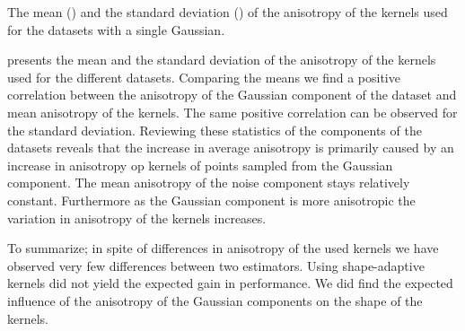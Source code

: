	\begin{table}
		\centering
		
		\caption{The mean (\mean) and the standard deviation (\SD) of the anisotropy of the kernels used for the datasets with a single Gaussian.}
		\label{tab:results:singleSphere:anisotropy}
	\end{table}
	 presents the mean and the standard deviation of the anisotropy of the kernels used for the different datasets. Comparing the means we find a positive correlation between the anisotropy of the Gaussian component of the dataset and mean anisotropy of the kernels. The same positive correlation can be observed for the standard deviation. 
	Reviewing these statistics of the components of the datasets reveals that the increase in average anisotropy is primarily caused by an increase in anisotropy op kernels of points sampled from the Gaussian component. The mean anisotropy of the noise component stays relatively constant. Furthermore as the Gaussian component is more anisotropic the variation in anisotropy of the kernels increases.

To summarize; in spite of differences in anisotropy of the used kernels we have observed very few differences between two estimators. Using shape-adaptive kernels did not yield the expected gain in performance. We did find the expected influence of the anisotropy of the Gaussian components on the shape of the kernels. 
